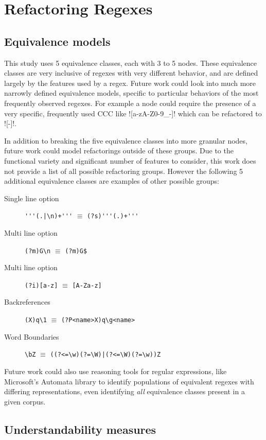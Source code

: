 \section{Refactoring Regexes}

\subsection{Equivalence models}
This study uses 5 equivalence classes, each with 3 to 5 nodes.  These equivalence classes are very inclusive of regexes with very different behavior, and are defined largely by the features used by a regex.  Future work could look into much more narrowly defined equivalence models, specific to particular behaviors of the most frequently observed regexes.  For example a node could require the presence of a very specific, frequently used CCC like \cverb![a-zA-Z0-9_-]! which can be refactored to \cverb![\w-]!.

In addition to breaking the five equivalence classes into more granular nodes, future work could model refactorings outside of these groups. Due to the functional variety and significant number of features to consider, this work does not provide a list of all possible refactoring groups.  However the following 5 additional equivalence classes are examples of other possible groups:
\begin{description}
\item[Single line option]  \verb!'''(.|\n)+'''! $\equiv$ \verb!(?s)'''(.)+'''!
\item[Multi line option]  \verb!(?m)G\n! $\equiv$ \verb!(?m)G$!
\item[Multi line option]  \verb!(?i)[a-z]! $\equiv$ \verb![A-Za-z]!
\item[Backreferences]  \verb!(X)q\1! $\equiv$ \verb!(?P<name>X)q\g<name>!
\item[Word Boundaries]  \verb!\bZ! $\equiv$ \verb!((?<=\w)(?=\W)|(?<=\W)(?=\w))Z!
\end{description}

Future work could also use reasoning tools for regular expressions, like Microsoft's Automata library to identify populations of equivalent regexes with differing representations, even identifying \emph{all} equivalence classes present in a given corpus.

\subsection{Understandability measures}

